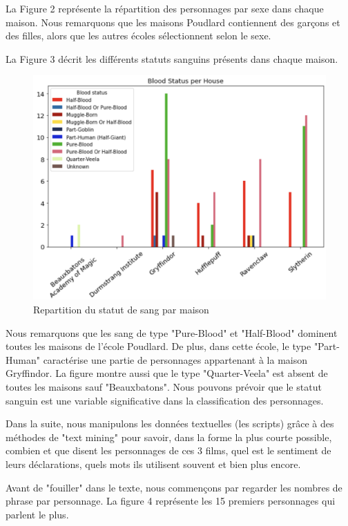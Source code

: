 \documentclass[11pt]{article}
\begin{document}
La Figure 2 représente la répartition des personnages par sexe dans chaque maison. Nous remarquons que les maisons Poudlard contiennent des garçons et des filles, alors que les autres écoles sélectionnent selon le sexe.\par

La Figure 3 décrit les différents statuts sanguins présents dans chaque maison.

\begin{figure}[hbt!]
    \centering
    \includegraphics[width= 13cm, height= 8 cm]{./figures/blood_status.png}
    \caption{Repartition du statut de sang par maison}
\end{figure}
\FloatBarrier

Nous remarquons que les sang de type "Pure-Blood" et "Half-Blood" dominent toutes les maisons de l'école Poudlard. De plus, dans cette école, le type "Part-Human" caractérise une partie de personnages appartenant à la maison Gryffindor. La figure montre aussi que le type "Quarter-Veela" est absent de toutes les maisons sauf "Beauxbatons". Nous pouvons prévoir que le statut sanguin est une variable significative dans la classification des personnages.\par

Dans la suite, nous manipulons les données textuelles (les scripts) grâce à des méthodes de "text mining" pour savoir, dans la forme la plus courte possible, combien et que disent les personnages de ces 3 films, quel est le sentiment de leurs déclarations, quels mots ils utilisent souvent et bien plus encore.\par

Avant de "fouiller" dans le texte, nous commençons par regarder les nombres de phrase par personnage. La figure 4 représente les 15 premiers personnages qui parlent le plus.
\end{document}
